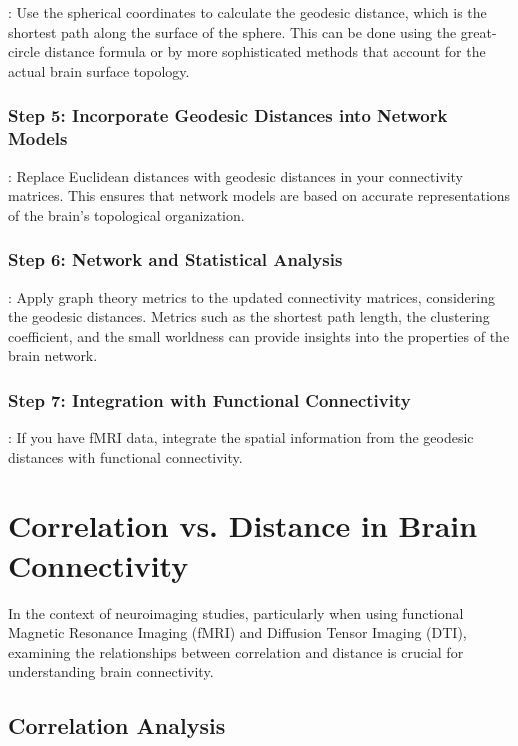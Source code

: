 \documentclass[twocolumn]{article}
\begin{document}
: Use the spherical coordinates to calculate the geodesic distance, which is the shortest path along the
surface of the sphere. This can be done using the great-circle distance formula or by more sophisticated methods that account for the actual brain
surface topology.

\subsubsection*{Step  5: Incorporate Geodesic Distances into Network Models}

: Replace Euclidean distances with geodesic distances in your connectivity matrices. This ensures that
network models are based on accurate representations of the brain's topological organization.

\subsubsection*{Step  6: Network and Statistical Analysis}

: Apply graph theory metrics to the updated connectivity matrices, considering the geodesic distances. Metrics
such as the shortest path length, the clustering coefficient, and the small worldness can provide insights into the properties of the brain network.

\subsubsection*{Step  7: Integration with Functional Connectivity}

: If you have fMRI data, integrate the spatial information from the geodesic distances with functional connectivity.

\section{Correlation vs. Distance in Brain Connectivity}

In the context of neuroimaging studies, particularly when using functional Magnetic Resonance Imaging (fMRI) and Diffusion Tensor Imaging (DTI),
examining the relationships between correlation and distance is crucial for understanding brain connectivity.

\subsection{Correlation Analysis}
\end{document}
